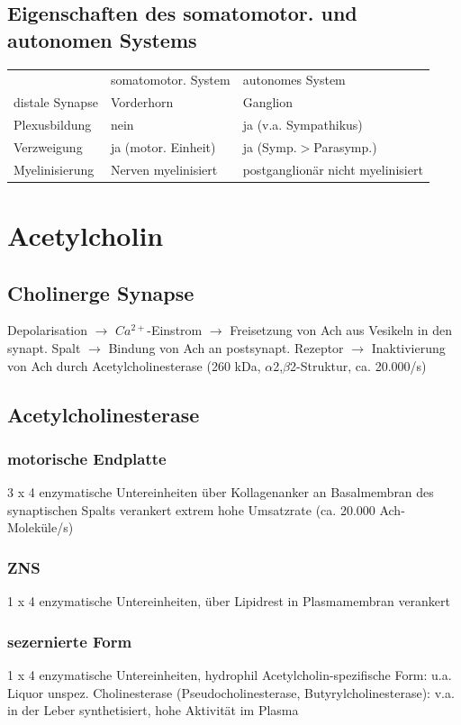 \documentclass[10pt,a4paper]{report}
\begin{document}
\subsection{Eigenschaften des somatomotor. und autonomen Systems}
\begin{tabularx}{\textwidth}{XXX}
&somatomotor. System&autonomes System\\
distale Synapse&Vorderhorn&	Ganglion\\
Plexusbildung&nein&ja (v.a. Sympathikus)\\
Verzweigung&ja (motor. Einheit)&ja (Symp.$>$Parasymp.)\\
Myelinisierung&Nerven myelinisiert&postganglionär nicht myelinisiert\\
\end{tabularx}
\section{Acetylcholin}
\subsection{Cholinerge Synapse}
Depolarisation $\rightarrow$ $Ca^{2+}$-Einstrom $\rightarrow$ 	Freisetzung von Ach aus Vesikeln in den synapt. Spalt $\rightarrow$ Bindung von Ach an postsynapt. Rezeptor $\rightarrow$ Inaktivierung von Ach durch Acetylcholinesterase (260 kDa, $\alpha$2,$\beta$2-Struktur, ca. 20.000/s)
\subsection{Acetylcholinesterase}
\subsubsection{motorische Endplatte}
3 x 4 enzymatische Untereinheiten über Kollagenanker an Basalmembran des synaptischen Spalts verankert extrem hohe Umsatzrate (ca. 20.000 Ach-Moleküle/s)
\subsubsection{ZNS}
1 x 4 enzymatische Untereinheiten, über Lipidrest in Plasmamembran verankert
\subsubsection{sezernierte Form} 
1 x 4 enzymatische Untereinheiten, hydrophil
Acetylcholin-spezifische Form: u.a. Liquor
unspez. Cholinesterase (Pseudocholinesterase, Butyrylcholinesterase): v.a. in der Leber synthetisiert, hohe Aktivität im Plasma
\end{document}
